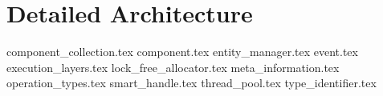 \section{Detailed Architecture}

{component_collection.tex}
{component.tex}
{entity_manager.tex}
{event.tex}
{execution_layers.tex}
{lock_free_allocator.tex}
{meta_information.tex}
{operation_types.tex}
{smart_handle.tex}
{thread_pool.tex}
{type_identifier.tex}
